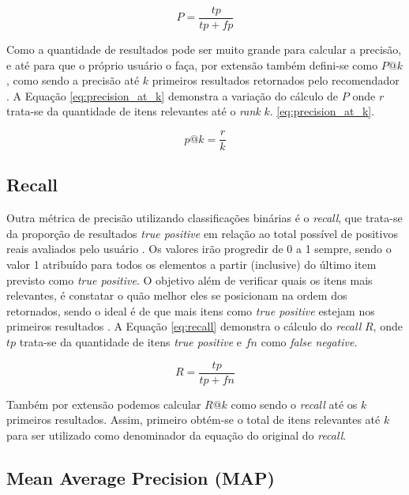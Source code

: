 \begin{equation}
	P = \frac{tp}{tp + fp}
\label{eq:precision}
\end{equation}

Como a quantidade de resultados pode ser muito grande para calcular a precisão, e até para que o próprio usuário o faça, por extensão também defini-se como $P@k$, como sendo a precisão até $k$ primeiros resultados retornados pelo recomendador \citep{Aggarwal2016:Evaluation}. A Equação \ref{eq:precision_at_k} demonstra a variação do cálculo de $P$ onde $r$ trata-se da quantidade de itens relevantes até o \textit{rank} $k$. \ref{eq:precision_at_k}.

\begin{equation}
	p@k = \frac{r}{k}
\label{eq:precision_at_k}
\end{equation}

\subsection{Recall}

Outra métrica de precisão utilizando classificações binárias é o \textit{recall}, que trata-se da proporção de resultados \textit{true positive} em relação ao total possível de positivos reais avaliados pelo usuário \citep{Powers_2008}. Os valores irão progredir de 0 a 1 sempre, sendo o valor 1 atribuído para todos os elementos a partir (inclusive) do último item previsto como \textit{true positive}. O objetivo além de verificar quais os itens mais relevantes, é constatar o quão melhor eles se posicionam na ordem dos retornados, sendo o ideal é de que mais itens como \textit{true positive} estejam nos primeiros resultados \citep{Jannach:2010}. A Equação \ref{eq:recall} demonstra o cálculo do \textit{recall} $R$, onde $tp$ trata-se da quantidade de itens \textit{true positive} e $fn$ como \textit{false negative}.

\begin{equation}
	R = \frac{tp}{tp + fn}
\label{eq:recall}
\end{equation}

Também por extensão podemos calcular $R@k$ como sendo o \textit{recall} até os $k$ primeiros resultados. Assim, primeiro obtém-se o total de itens relevantes até $k$ para ser utilizado como denominador da equação do original do \textit{recall}.

\subsection{Mean Average Precision (MAP)}


